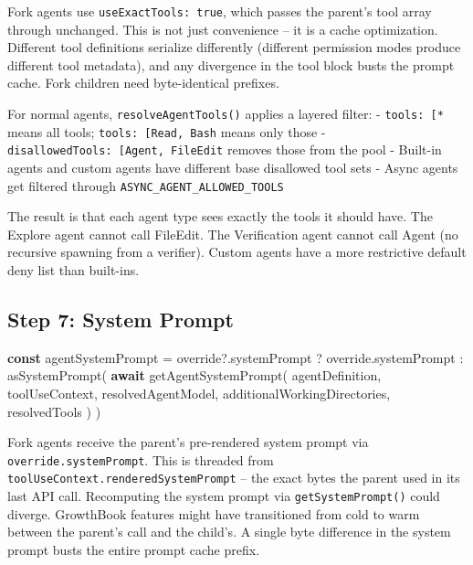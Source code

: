 \documentclass[
  english,
  11pt,
  letterpaper,
]{book}
\newenvironment{Shaded}{\begin{snugshade}}{\end{snugshade}}
\newcommand{\AttributeTok}[1]{\textcolor[rgb]{0.40,0.45,0.13}{#1}}
\newcommand{\ControlFlowTok}[1]{\textcolor[rgb]{0.00,0.23,0.31}{\textbf{#1}}}
\newcommand{\FunctionTok}[1]{\textcolor[rgb]{0.28,0.35,0.67}{#1}}
\newcommand{\KeywordTok}[1]{\textcolor[rgb]{0.00,0.23,0.31}{\textbf{#1}}}
\newcommand{\NormalTok}[1]{\textcolor[rgb]{0.00,0.23,0.31}{#1}}
\newcommand{\OperatorTok}[1]{\textcolor[rgb]{0.37,0.37,0.37}{#1}}
\begin{document}
Fork agents use \texttt{useExactTools:\ true}, which passes the parent's
tool array through unchanged. This is not just convenience -- it is a
cache optimization. Different tool definitions serialize differently
(different permission modes produce different tool metadata), and any
divergence in the tool block busts the prompt cache. Fork children need
byte-identical prefixes.

For normal agents, \texttt{resolveAgentTools()} applies a layered
filter: - \texttt{tools:\ {[}\textquotesingle{}*\textquotesingle{}{]}}
means all tools;
\texttt{tools:\ {[}\textquotesingle{}Read\textquotesingle{},\ \textquotesingle{}Bash\textquotesingle{}{]}}
means only those -
\texttt{disallowedTools:\ {[}\textquotesingle{}Agent\textquotesingle{},\ \textquotesingle{}FileEdit\textquotesingle{}{]}}
removes those from the pool - Built-in agents and custom agents have
different base disallowed tool sets - Async agents get filtered through
\texttt{ASYNC\_AGENT\_ALLOWED\_TOOLS}

The result is that each agent type sees exactly the tools it should
have. The Explore agent cannot call FileEdit. The Verification agent
cannot call Agent (no recursive spawning from a verifier). Custom agents
have a more restrictive default deny list than built-ins.

\subsection{Step 7: System Prompt}\label{step-7-system-prompt}

\begin{Shaded}
\begin{Highlighting}[]
\KeywordTok{const}\NormalTok{ agentSystemPrompt }\OperatorTok{=}\NormalTok{ override}\OperatorTok{?.}\AttributeTok{systemPrompt}
  \OperatorTok{?}\NormalTok{ override}\OperatorTok{.}\AttributeTok{systemPrompt}
  \OperatorTok{:} \FunctionTok{asSystemPrompt}\NormalTok{(}
      \ControlFlowTok{await} \FunctionTok{getAgentSystemPrompt}\NormalTok{(}
\NormalTok{        agentDefinition}\OperatorTok{,}\NormalTok{ toolUseContext}\OperatorTok{,}
\NormalTok{        resolvedAgentModel}\OperatorTok{,}\NormalTok{ additionalWorkingDirectories}\OperatorTok{,}\NormalTok{ resolvedTools}
\NormalTok{      )}
\NormalTok{    )}
\end{Highlighting}
\end{Shaded}

Fork agents receive the parent's pre-rendered system prompt via
\texttt{override.systemPrompt}. This is threaded from
\texttt{toolUseContext.renderedSystemPrompt} -- the exact bytes the
parent used in its last API call. Recomputing the system prompt via
\texttt{getSystemPrompt()} could diverge. GrowthBook features might have
transitioned from cold to warm between the parent's call and the
child's. A single byte difference in the system prompt busts the entire
prompt cache prefix.
\end{document}
